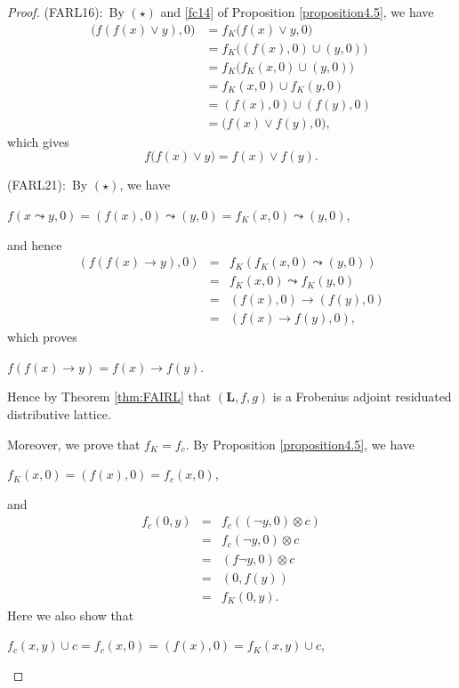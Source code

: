 \documentclass[final,12pt,times]{elsarticle}
\theoremstyle{plain}
\theoremstyle{definition}
\theoremstyle{break}
\begin{document}
\begin{proof}
(FARL16):\ By $(\star)$ and \eqref{fc14} of Proposition \ref{proposition4.5}, we have
\[
\begin{aligned}
\bigl(f(f(x)\vee y),0\bigr)
&=
f_K\bigl(f(x)\vee y,0\bigr)\\
&=
f_K\bigl((f(x),0)\cup(y,0)\bigr)\\
&=
f_K\bigl(f_K(x,0)\cup(y,0)\bigr)\\
&=
f_K(x,0)\cup f_K(y,0)\\
&=
(f(x),0)\cup(f(y),0)\\
&=
\bigl(f(x)\vee f(y),0\bigr),
\end{aligned}
\]
which gives
\[
f\bigl(f(x)\vee y\bigr)=f(x)\vee f(y).
\]

(FARL21):\ By $(\star)$, we have
\begin{center} $f(x\leadsto y,0)=(f(x),0)\leadsto (y,0)=f_K(x,0)\leadsto (y,0)$,
\end{center}
and hence
\begin{eqnarray*}
               (f(f(x)\rightarrow y),0)&=&f_K(f_K(x,0)\leadsto (y,0))\\&=&f_K(x,0)\leadsto f_K(y,0)\\&=&(f(x),0)\rightarrow (f(y),0)\\&=&(f(x)\rightarrow f(y),0),
               \end{eqnarray*}
which proves
\begin{center} $f(f(x)\rightarrow y)=f(x)\rightarrow f(y)$.
 \end{center}
Hence by Theorem \ref{thm:FAIRL} that $(\mathbf{L},f,g)$ is a Frobenius adjoint residuated distributive lattice.

Moreover, we prove that $f_K=f_c$. By Proposition \ref{proposition4.5}, we have
\begin{center} $f_K(x,0)=(f(x),0)=f_c(x,0)$,
\end{center}
and
\begin{eqnarray*}
              f_c(0,y)&=&f_c(({\neg}y,0)\otimes c)\\&=& f_c({\neg}y,0)\otimes c\\&=&(f {\neg}y,0)\otimes c\\&=& (0,f(y))\\&=& f_K(0,y).
               \end{eqnarray*}
Here we also show that
\begin{center} $f_c(x,y)\cup c=f_c(x,0)=(f(x),0)=f_K(x,y)\cup c$,


\end{center}
\end{proof}
\end{document}

